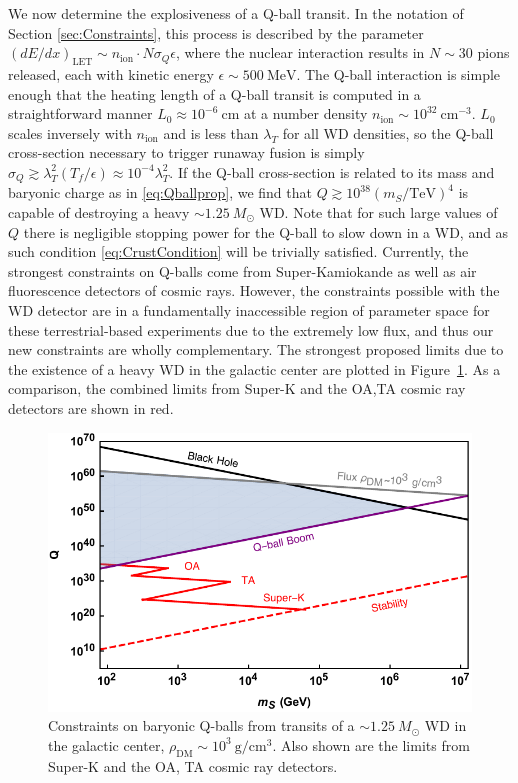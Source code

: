 \documentclass[twocolumn,showpacs,preprintnumbers,amsmath,amssymb,prd]{revtex4}
\begin{document}
We now determine the explosiveness of a Q-ball transit. 
In the notation of Section \ref{sec:Constraints}, this process is described by the parameter $(dE/dx)_\text{LET} \sim n_\text{ion} \cdot N \sigma_Q \epsilon$, where the nuclear interaction results in $N \sim 30$ pions released, each with kinetic energy $\epsilon \sim 500 ~\text{MeV}$.
The Q-ball interaction is simple enough that the heating length of a Q-ball transit is computed in a straightforward manner $L_0 \approx 10^{-6} ~\text{cm}$ at a number density $n_\text{ion} \sim 10^{32}~\text{cm}^{-3}$. $L_0$ scales inversely with $n_\text{ion}$ and is less than $\lambda_T$ for all WD densities, so the Q-ball cross-section necessary to trigger runaway fusion is simply $\sigma_Q \gtrsim \lambda_T^2 (T_f/\epsilon) \approx 10^{-4} \lambda_T^2$.
If the Q-ball cross-section is related to its mass and baryonic charge as in \eqref{eq:Qballprop}, we find that $Q \gtrsim 10^{38} (m_S/\text{TeV})^4$ is capable of destroying a heavy $\sim 1.25 ~M_{\odot}$ WD.
Note that for such large values of $Q$ there is negligible stopping power for the Q-ball to slow down in a WD, and as such condition \eqref{eq:CrustCondition} will be trivially satisfied.
Currently, the strongest constraints on Q-balls come from Super-Kamiokande as well as air fluorescence detectors of cosmic rays.
However, the constraints possible with the WD detector are in a fundamentally inaccessible region of parameter space for these terrestrial-based experiments due to the extremely low flux, and thus our new constraints are wholly complementary.
The strongest proposed limits due to the existence of a heavy WD in the galactic center are plotted in Figure~\ref{fig:Qballconstraint}. As a comparison, the combined limits from Super-K and the OA,TA cosmic ray detectors are shown in red. 
\begin{figure}
\includegraphics[scale=.55]{Qballconstraint.pdf}
\caption{Constraints on baryonic Q-balls from transits of a $\sim 1.25 ~M_{\odot}$ WD in the galactic center, $\rho_\text{DM} \sim 10^3 ~\text{g}/\text{cm}^3$. Also shown are the limits from Super-K and the OA, TA cosmic ray detectors.}
\label{fig:Qballconstraint}
\end{figure}
\end{document}

